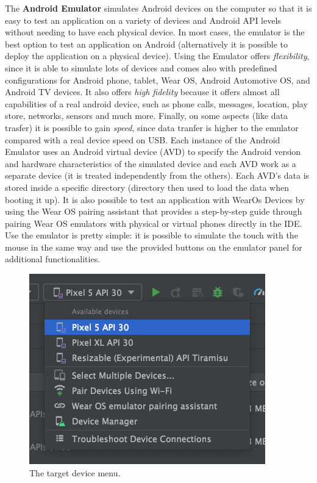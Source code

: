 \noindent \newline The \textbf{Android Emulator} simulates Android devices on the computer so that it is easy to test an application on a variety of devices and Android API levels without needing to have each physical device. In most cases, the emulator is the best option to test an application on Android (alternatively it is possible to deploy the application on a physical device). Using the Emulator offers \textit{flexibility}, since it is able to simulate lots of devices and comes also with predefined configurations for Android phone, tablet, Wear OS, Android Automotive OS, and Android TV devices. It also offers \textit{high fidelity} because it offers almost all capabilities of a real android device, such as phone calls, messages, location, play store, networks, sensors and much more. Finally, on some aspects (like data trasfer) it is possible to gain \textit{speed}, since data tranfer is higher to the emulator compared with a real device speed on USB. Each instance of the Android Emulator uses an Android virtual device (AVD) to specify the Android version and hardware characteristics of the simulated device and each AVD work as a separate device (it is treated independently from the others). Each AVD's data is stored inside a specific directory (directory then used to load the data when booting it up). It is also possible to test an application with WearOs Devices by using the Wear OS pairing assistant that provides a step-by-step guide through pairing Wear OS emulators with physical or virtual phones directly in the IDE. Use the emulator is pretty simple: it is possible to simulate the touch with the mouse in the same way and use the provided buttons on the emulator panel for additional functionalities\cite{AndroidStudioEmulatorFeature}.

\begin{figure}
    \centering
    \includegraphics[width=0.6\linewidth]{./images/target_devices_dropdown.png}
    \caption[The target device menu.]{The target device menu\protect\cite{AndroidStudioEmulatorFeature}.}
\end{figure}

